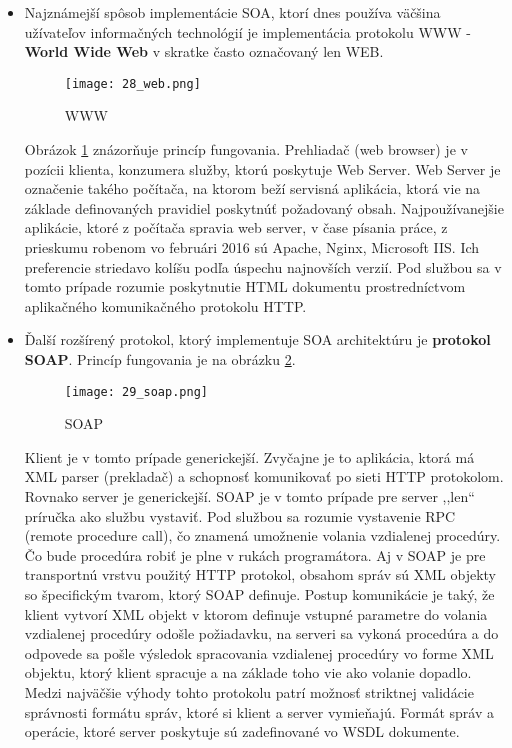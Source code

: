 \begin{itemize}
 \item Najznámejší spôsob implementácie SOA, ktorí dnes používa väčšina užívateľov informačných technológií je implementácia protokolu WWW - \textbf{World Wide Web} v skratke často označovaný len WEB. 
\begin{figure}[h]
\centering
\texttt{[image: 28\_web.png]}
\caption{WWW \cite{IOT14}}
\label{28_web}
\end{figure} 
Obrázok \ref{28_web} znázorňuje princíp fungovania. Prehliadač (web browser) je v pozícii klienta, konzumera služby, ktorú poskytuje Web Server. Web Server je označenie takého počítača, na ktorom beží servisná aplikácia, ktorá vie na základe definovaných pravidiel poskytnúť požadovaný obsah. Najpoužívanejšie aplikácie, ktoré z počítača spravia web server,  v čase písania práce, z prieskumu robenom vo februári 2016 \cite{IOT15} sú Apache, Nginx, Microsoft IIS. Ich preferencie striedavo kolíšu podľa úspechu najnovších verzií. Pod službou sa v tomto prípade rozumie poskytnutie HTML dokumentu prostredníctvom aplikačného komunikačného protokolu HTTP.
\item Ďalší rozšírený protokol, ktorý implementuje SOA architektúru je \textbf{protokol SOAP}. Princíp fungovania je na obrázku \ref{29_soap}.
\begin{figure}[h]
\centering
\texttt{[image: 29\_soap.png]}
\caption{SOAP \cite{IOT14}}
\label{29_soap}
\end{figure} 
Klient je v tomto prípade generickejší. Zvyčajne je to aplikácia, ktorá má XML parser (prekladač) a schopnosť komunikovať po sieti HTTP protokolom. Rovnako server je generickejší. SOAP je v tomto prípade pre server ,,len`` príručka ako službu vystaviť. Pod službou sa rozumie vystavenie RPC (remote procedure call), čo znamená umožnenie volania vzdialenej procedúry. Čo bude procedúra robiť je plne v rukách programátora. Aj v SOAP je pre transportnú vrstvu použitý HTTP protokol, obsahom správ sú XML objekty so špecifickým tvarom, ktorý SOAP definuje. Postup komunikácie je taký, že klient vytvorí XML objekt v ktorom definuje vstupné parametre do volania vzdialenej procedúry odošle požiadavku, na serveri sa vykoná procedúra a do odpovede sa pošle výsledok spracovania vzdialenej procedúry vo forme XML objektu, ktorý klient spracuje a na základe toho vie ako volanie dopadlo. 
Medzi najväčšie výhody tohto protokolu patrí možnosť striktnej validácie správnosti formátu správ, ktoré si klient a server vymieňajú. Formát správ a operácie, ktoré server poskytuje sú zadefinované vo WSDL dokumente. 

\end{itemize}
